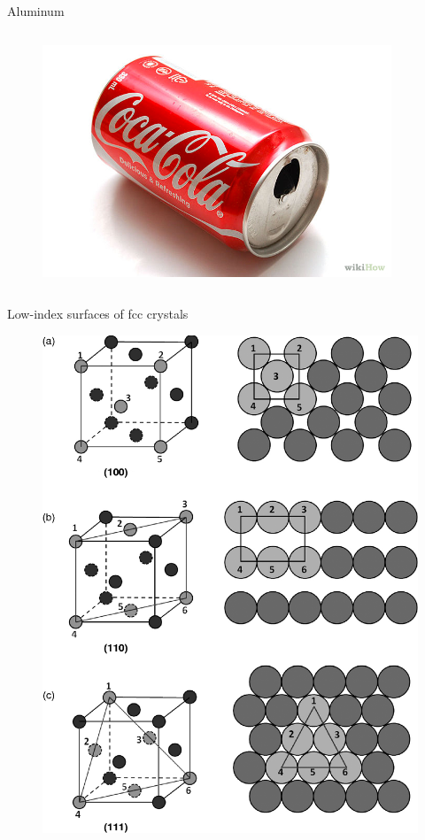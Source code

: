 \documentclass[aspectratio=169]{beamer}
\begin{document}
\begin{frame}{Aluminum}
\begin{columns}
\begin{figure}
            \includegraphics[width=0.8\linewidth]{lectures/figures/Lab4_Al4.png}
        \end{figure}

\end{columns} 

    \end{frame}

    \begin{frame}{Low-index surfaces of fcc crystals}

        \begin{figure}
            \centering
            \includegraphics[width=0.3\linewidth]{lectures/figures/Lab4_fcc_surfaces.png}
        \end{figure}
    \end{frame}
\end{document}
